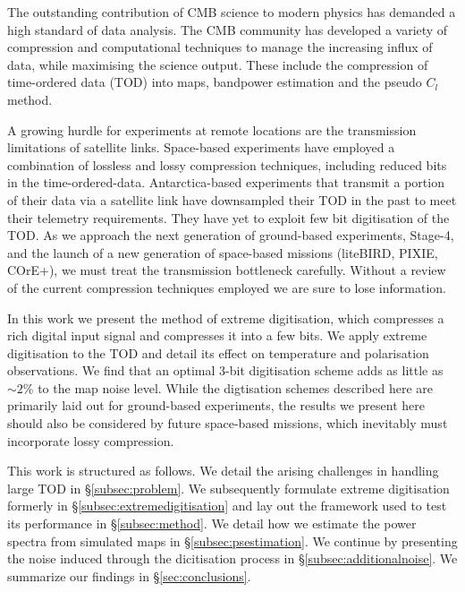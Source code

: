\documentclass[apj]{emulateapj}
\begin{document}
The outstanding contribution of CMB science to modern physics has demanded a high standard of data analysis. The CMB community has developed a variety of compression and computational techniques to manage the increasing influx of data, while maximising the science output. These include the compression of time-ordered data (TOD) into maps, bandpower estimation and the pseudo $C_l$ method.

A growing hurdle for experiments at remote locations are the transmission limitations of satellite links. Space-based experiments have employed a combination of lossless and lossy compression techniques, including reduced bits in the time-ordered-data. Antarctica-based experiments that transmit a portion of their data via a satellite link have downsampled their TOD in the past to meet their telemetry requirements. They have yet to exploit few bit digitisation of the TOD. As we approach the next generation of ground-based experiments, Stage-4, and the launch of a new generation of space-based missions (liteBIRD, PIXIE, COrE+), we must treat the transmission bottleneck carefully. Without a review of the current compression techniques employed we are sure to lose information.

In this work we present the method of extreme digitisation, which compresses a rich digital input signal and compresses it into a few bits. We apply extreme digitisation to the TOD and detail its effect on temperature and polarisation observations. We find that an optimal 3-bit digitisation scheme adds as little as $\sim 2\%$ to the map noise level. While the digtisation schemes described here are primarily laid out for ground-based experiments, the results we present here should also be considered by future space-based missions, which inevitably must incorporate lossy compression.

This work is structured as follows. We detail the arising challenges in handling large TOD in \S\ref{subsec:problem}. We subsequently formulate extreme digitisation formerly in \S\ref{subsec:extremedigitisation} and lay out the framework used to test its performance in \S\ref{subsec:method}. We detail how we estimate the power spectra from simulated maps in \S\ref{subsec:psestimation}. We continue by presenting the noise induced through the dicitisation process in \S\ref{subsec:additionalnoise}. We summarize our findings in \S\ref{sec:conclusions}. 

\end{document}
